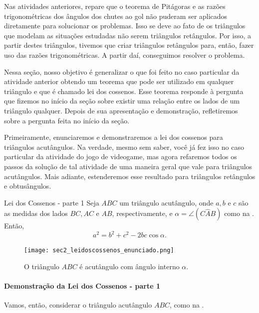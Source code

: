 \label{org_leidoscossenos}

Nas atividades anteriores, repare que o teorema de Pitágoras e as razões trigonométricas dos ângulos dos chutes ao gol não puderam ser aplicados diretamente para solucionar os problemas. Isso se deve ao fato de os triângulos que modelam as situações estudadas não serem triângulos retângulos. Por isso, a partir destes triângulos, tivemos que criar triângulos retângulos para, então, fazer uso das razões trigonométricas. A partir daí, conseguimos resolver o problema.

Nessa seção, nosso objetivo é generalizar o que foi feito no caso particular da atividade anterior obtendo um teorema que pode ser utilizado em qualquer triângulo e que é chamado lei dos cossenos. Esse teorema responde à pergunta que fizemos no início da seção sobre existir uma relação entre os lados de um triângulo qualquer. Depois de sua apresentação e demonstração, refletiremos sobre a pergunta feita no início da seção.

Primeiramente, enunciaremos e demonstraremos a lei dos cossenos para triângulos acutângulos. Na verdade, mesmo sem saber, você já fez isso no caso particular da atividade do jogo de videogame, mas agora refaremos todos os passos da solução de tal atividade de uma maneira geral que vale para  triângulos acutângulos. Mais adiante, estenderemos esse resultado para triângulos retângulos e obtusângulos.

\begin{observationtitle}{Lei dos Cossenos - parte 1}
\leavevmode{}\label{sec2_leidoscossenos_parte1}
Seja $ABC$ um triângulo acutângulo, onde $a, b$ e $c$ são as medidas dos lados $BC, AC$ e $AB$, respectivamente, e $\alpha=\angle(C\hat{A}B)$ como na . Então,
\begin{equation}
    a^2=b^2+c^2-2bc\cos\alpha. \label{sec2_leidoscossenos_acut_eq}
\end{equation}
\begin{figure}[H]
    \centering
    \texttt{[image: sec2\_leidoscossenos\_enunciado.png]}
    \caption{O triângulo $ABC$ é acutângulo com ângulo interno $\alpha$.}
    \label{sec2_leidoscossenos_enunciado1}
\end{figure}
\end{observationtitle}


\paragraph{Demonstração da Lei dos Cossenos - parte 1}
\label{sec2_leidoscossenos_demo}
Vamos, então, considerar o triângulo acutângulo $ABC$, como na .


